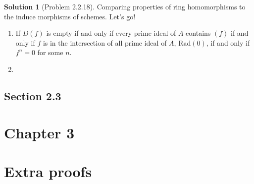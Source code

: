 \documentclass[aps,pra,showpacs,notitlepage,onecolumn,superscriptaddress,nofootinbib]{revtex4-1}
\theoremstyle{definition}
\newtheorem{solution}{Solution}[section]
\begin{document}
\begin{solution}[Problem 2.2.18]
Comparing properties of ring homomorphisms to the induce morphisms of schemes. Let's go!
\begin{enumerate}
  \item If $D(f)$ is empty if and only if every prime ideal of $A$ contains $(f)$ if and only if $f$ is in the intersection of all prime ideal of $A$, $\text{Rad}(0)$, if and only if $f^n = 0$ for some $n$.
    \item 
  \end{enumerate}
  \end{solution}

\subsection{Section 2.3}

\section{Chapter 3}

\appendix

\section{Extra proofs}
\label{appx:extra}
\end{document}
